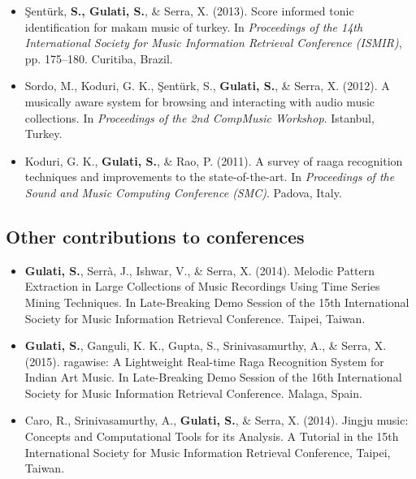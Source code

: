 \begin{itemize}[leftmargin=*]
	\item \c{S}ent{\"u}rk, \textbf{S., Gulati, S.}, \& Serra, X. (2013). Score informed tonic identification for makam music of turkey. In \textit{Proceedings of the 14th International Society for Music Information Retrieval Conference (ISMIR)}, pp. 175–180. Curitiba, Brazil.
	\item Sordo, M., Koduri, G. K., \c{S}ent{\"u}rk, S., \textbf{Gulati, S.}, \& Serra, X. (2012). A musically aware system for browsing and interacting with audio music collections. In \textit{Proceedings of the 2nd CompMusic Workshop}. Istanbul, Turkey.
	\item Koduri, G. K., \textbf{Gulati, S.}, \& Rao, P. (2011). A survey of raaga recognition techniques and improvements to the state-of-the-art. In \textit{Proceedings of the Sound and Music Computing Conference (SMC)}. Padova, Italy.
\end{itemize}
%
\subsection*{Other contributions to conferences}
\begin{itemize}[leftmargin=*]
	\item \textbf{Gulati, S.},  Serr{\`a}, J., Ishwar, V., \& Serra, X. (2014). Melodic Pattern Extraction in Large Collections of Music Recordings Using Time Series Mining Techniques. In Late-Breaking Demo Session of the 15th International Society for Music Information Retrieval Conference. Taipei, Taiwan. 
	\item \textbf{Gulati, S.}, Ganguli, K. K., Gupta, S., Srinivasamurthy, A., \& Serra, X. (2015). \gls{ragawise}: A Lightweight Real-time Raga Recognition System for Indian Art Music. In Late-Breaking Demo Session of the 16th International Society for Music Information Retrieval Conference. Malaga, Spain. 
	\item Caro, R., Srinivasamurthy, A., \textbf{Gulati, S.}, \& Serra, X. (2014). Jingju music: Concepts and Computational Tools for its Analysis. A Tutorial in the 15th International Society for Music Information Retrieval Conference, Taipei, Taiwan. 
	
\end{itemize}




